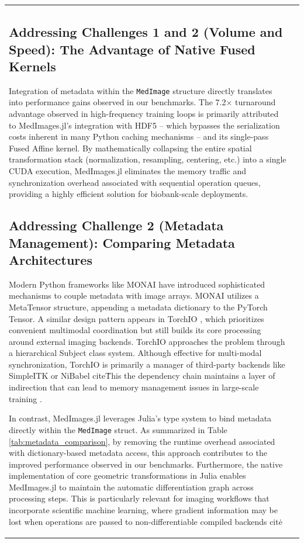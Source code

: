 \documentclass[10pt,letterpaper]{article}
\begin{document}
\begin{table}[H]
\begin{tabular}{|p{}|p{}|}
\subsection*{Addressing Challenges 1 and 2 (Volume and Speed): The Advantage of Native Fused Kernels}
Integration of metadata within the \texttt{MedImage} structure directly translates into performance gains observed in our benchmarks. The 7.2$\times$ turnaround advantage observed in high-frequency training loops is primarily attributed to MedImages.jl's integration with HDF5 -- which bypasses the serialization costs inherent in many Python caching mechanisms -- and its single-pass Fused Affine kernel. By mathematically collapsing the entire spatial transformation stack (normalization, resampling, centering, etc.) into a single CUDA execution, MedImages.jl eliminates the memory traffic and synchronization overhead associated with sequential operation queues, providing a highly efficient solution for biobank-scale deployments.

\subsection*{Addressing Challenge 2 (Metadata Management): Comparing Metadata Architectures}
Modern Python frameworks like MONAI \cite{CardosoLi2022} have introduced sophisticated mechanisms to couple metadata with image arrays. MONAI utilizes a MetaTensor structure, appending a metadata dictionary to the PyTorch Tensor. A similar design pattern appears in TorchIO \cite{perezgarcia2021torchio}, which prioritizes convenient multimodal coordination but still builds its core processing around external imaging backends. TorchIO approaches the problem through a hierarchical Subject class system. Although effective for multi-modal synchronization, TorchIO is primarily a manager of third-party backends  like SimpleITK or NiBabel cite\. This the dependency chain maintains a layer of indirection that can lead to memory management issues in large-scale training \cite{perezgarcia2021torchio}.

In contrast, MedImages.jl leverages Julia's type system to bind metadata directly within the \texttt{MedImage} struct. As summarized in Table \ref{tab:metadata_comparison}, by removing the runtime overhead associated with dictionary-based metadata access, this approach contributes to the improved performance observed in our benchmarks. Furthermore, the native implementation of core geometric transformations in Julia enables MedImages.jl to maintain the automatic differentiation graph across processing steps. This is particularly relevant for imaging workflows that incorporate scientific machine learning, where gradient information may be lost when operations are passed to non-differentiable compiled backends cite\. 


\end{tabular}
\end{table}
\end{document}
